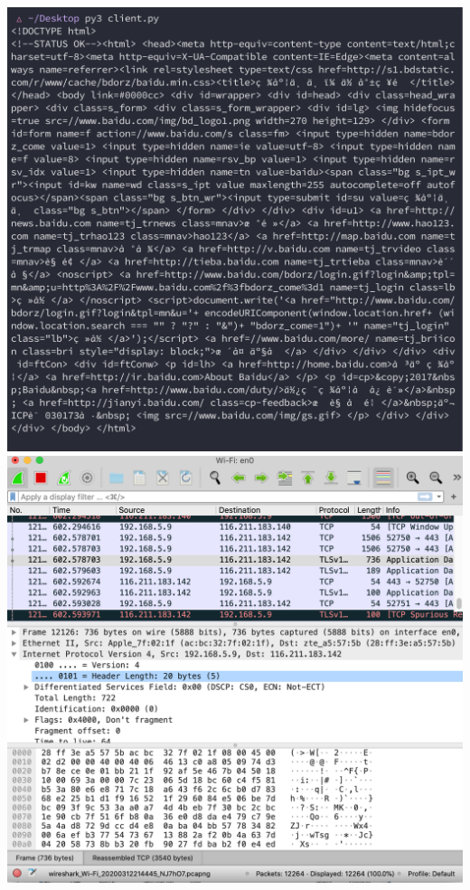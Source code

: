 \documentclass[11pt]{article}
\begin{document}
\includegraphics[scale=0.5]{ot2.png}\\
\includegraphics[scale=0.5]{ot3.png}
\end{document}

